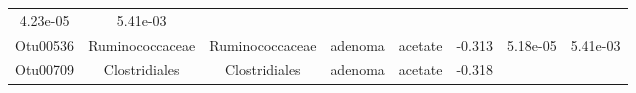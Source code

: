\documentclass[11pt,]{article}
\begin{document}
\begin{longtable}[]{@{}cccccccc@{}}
\begin{minipage}[t]{0.08\columnwidth}
4.23e-05\strut
\end{minipage} & \begin{minipage}[t]{0.08\columnwidth}\centering\strut
5.41e-03\strut
\end{minipage}\tabularnewline
\begin{minipage}[t]{0.08\columnwidth}\centering\strut
Otu00536\strut
\end{minipage} & \begin{minipage}[t]{0.15\columnwidth}\centering\strut
Ruminococcaceae\strut
\end{minipage} & \begin{minipage}[t]{0.15\columnwidth}\centering\strut
Ruminococcaceae\strut
\end{minipage} & \begin{minipage}[t]{0.08\columnwidth}\centering\strut
adenoma\strut
\end{minipage} & \begin{minipage}[t]{0.09\columnwidth}\centering\strut
acetate\strut
\end{minipage} & \begin{minipage}[t]{0.07\columnwidth}\centering\strut
-0.313\strut
\end{minipage} & \begin{minipage}[t]{0.08\columnwidth}\centering\strut
5.18e-05\strut
\end{minipage} & \begin{minipage}[t]{0.08\columnwidth}\centering\strut
5.41e-03\strut
\end{minipage}\tabularnewline
\begin{minipage}[t]{0.08\columnwidth}\centering\strut
Otu00709\strut
\end{minipage} & \begin{minipage}[t]{0.15\columnwidth}\centering\strut
Clostridiales\strut
\end{minipage} & \begin{minipage}[t]{0.15\columnwidth}\centering\strut
Clostridiales\strut
\end{minipage} & \begin{minipage}[t]{0.08\columnwidth}\centering\strut
adenoma\strut
\end{minipage} & \begin{minipage}[t]{0.09\columnwidth}\centering\strut
acetate\strut
\end{minipage} & \begin{minipage}[t]{0.07\columnwidth}\centering\strut
-0.318\strut
\end{minipage} & \begin{minipage}[t]{0.08\columnwidth}\centering\strut

\end{minipage}
\end{longtable}
\end{document}
